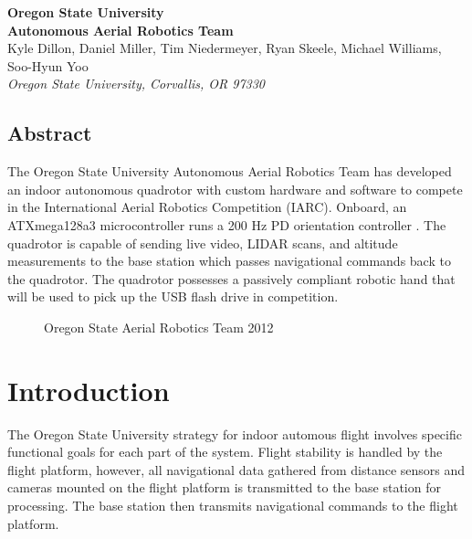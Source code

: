 \documentclass[12pt,letterpaper]{article}
\begin{document}
\begin{center}
{
    \bfseries\huge
    Oregon State University \\
    Autonomous Aerial Robotics Team \\ [1cm]
}
{
    \small
    Kyle Dillon, Daniel Miller, Tim Niedermeyer, Ryan Skeele, Michael Williams, Soo-Hyun Yoo \\ \vspace{0.5em}
    \emph{Oregon State University, Corvallis, OR 97330}
}

\end{center}

\begin{center}
\begin{minipage}{5.5in}

\section*{Abstract}

The Oregon State University Autonomous Aerial Robotics Team has developed
an indoor autonomous quadrotor with custom hardware and software to compete
in the International Aerial Robotics Competition (IARC). Onboard, an
ATXmega128a3 microcontroller runs a 200 Hz PD orientation controller
. The quadrotor is capable of sending live video,
LIDAR scans, and altitude measurements to the base station
which passes navigational commands back to the quadrotor. 
The quadrotor possesses a passively compliant robotic hand that will be used
to pick up the USB flash drive in competition.

\end{minipage}
\end{center}

\begin{figure}[h!]
\caption{Oregon State Aerial Robotics Team 2012}
\end{figure}




\section*{Introduction}

The Oregon State University strategy for indoor automous flight involves
specific functional goals for each part of the system. Flight stability is
handled by the flight platform, however, all navigational data gathered from
distance sensors and cameras mounted on the flight platform is transmitted to
the base station for processing. The base station then transmits navigational
commands to the flight platform.
\end{document}
